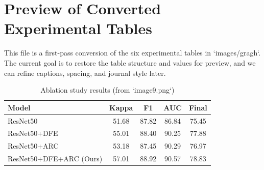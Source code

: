 \documentclass[a4paper,11pt]{article}
\begin{document}
\section*{Preview of Converted Experimental Tables}

This file is a first-pass conversion of the six experimental tables in `images/gragh`.
The current goal is to restore the table structure and values for preview, and we can refine captions, spacing, and journal style later.

\begin{table}[htbp]
\centering
\caption{Comparison with existing methods on Off-set and On-set (from `image7.png`)}
\end{table}

\begin{table}[htbp]
\centering
\caption{Ablation study results (from `image9.png`)}
\begin{tabular}{lcccc}
\toprule
Model & Kappa & F1 & AUC & Final \\
\midrule
ResNet50 & 51.68 & 87.82 & 86.84 & 75.45 \\
ResNet50+DFE & 55.01 & 88.40 & 90.25 & 77.88 \\
ResNet50+ARC & 53.18 & 87.45 & 90.29 & 76.97 \\
ResNet50+DFE+ARC (Ours) & 57.01 & 88.92 & 90.57 & 78.83 \\
\bottomrule
\end{tabular}
\end{table}
\end{document}
